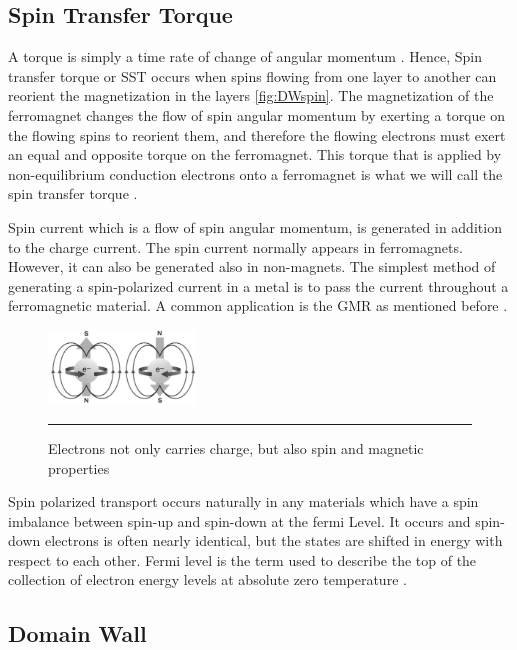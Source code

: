 \subsection{Spin Transfer Torque}

A torque is simply a time rate of change of angular momentum \cite{spintransfer}. Hence, Spin transfer torque or SST occurs when spins flowing from one layer to another can reorient the magnetization in the layers \ref{fig:DWspin}. The magnetization of the ferromagnet changes the flow of spin angular momentum by exerting a torque on the flowing spins to reorient them, and therefore the flowing electrons must exert an equal and opposite torque on the ferromagnet. This torque that is applied by non-equilibrium conduction electrons onto a ferromagnet is what we will call the spin transfer torque \cite{spintransfer}.

Spin current which is a flow of spin angular momentum, is generated in addition to the charge current. The spin current normally appears in ferromagnets. However, it can also be generated also in non-magnets. The simplest method of generating a spin-polarized current in a metal is to pass the current throughout a ferromagnetic material. A common application is the GMR as mentioned before \cite{handbookspin}.

\begin{figure}[htbp]
	\centering
		\includegraphics[width=0.35\textwidth]{Figures/electron.png}
		\rule{35em}{0.5pt}
	\caption[Electron carries spin, charge and magnetic]{Electrons not only carries charge, but also spin and magnetic properties }
	\label{fig:electron}
\end{figure}


Spin polarized transport occurs naturally in any materials which have a spin imbalance between spin-up and spin-down at the fermi Level. It occurs and spin-down electrons is often nearly identical, but the states are shifted in energy with respect to each other. Fermi level is the term used to describe the top of the collection of electron energy levels at absolute zero temperature \cite{handbookspin}.

\subsection{Domain Wall}

